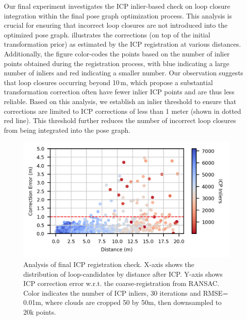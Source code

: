 Our final experiment investigates the ICP inlier-based check on loop closure integration within the final pose graph optimization process. This analysis is crucial for ensuring that incorrect loop closures are not introduced into the optimized pose graph.
 illustrates the corrections (on top of the initial transformation prior) as estimated by the ICP registration at various distances. Additionally, the figure color-codes the points based on the number of inlier points obtained during the registration process, with blue indicating a large number of inliers and red indicating a smaller number.
Our observation suggests that loop closures occurring beyond 10\,m, which propose a substantial transformation correction often have fewer inlier ICP points and are thus less reliable.
Based on this analysis, we establish an inlier threshold to ensure that corrections are limited to ICP corrections of less than 1 meter (shown in dotted red line). This threshold further reduces the number of incorrect loop closures from being integrated into the pose graph.
\begin{figure}[t]
  \centering
  \includegraphics[width=0.99\linewidth]{pics/exp_4_ablation_icp_inliers_4cm}
  \caption{Analysis of final ICP registration check. X-axis shows the distribution of loop-candidates by distance after ICP.
  Y-axis shows ICP correction error w.r.t. the coarse-registration from RANSAC. Color indicates the number of ICP inliers,  30 iterations and RMSE= 0.01m, where clouds are cropped 50 by 50m, then downsampled to 20k points.}
  \label{fig:icp_inliers}
\end{figure}



